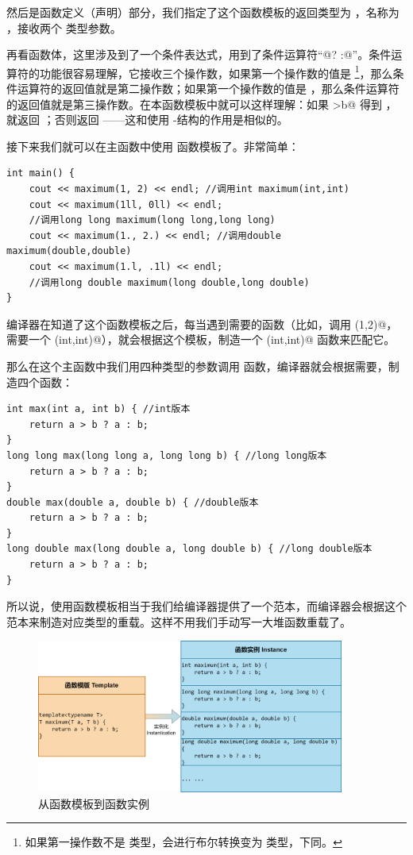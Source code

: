 然后是函数定义（声明）部分，我们指定了这个函数模板的返回类型为 \lstinline@T@，名称为 \lstinline@maximum@，接收两个 \lstinline@T@ 类型参数。\par
再看函数体，这里涉及到了一个条件表达式，用到了条件运算符``@? :@''。条件运算符的功能很容易理解，它接收三个操作数，如果第一个操作数的值是 \lstinline@true@\footnote{如果第一操作数不是 \lstinline@bool@ 类型，会进行布尔转换变为 \lstinline@bool@ 类型，下同。}，那么条件运算符的返回值就是第二操作数；如果第一个操作数的值是 \lstinline@false@，那么条件运算符的返回值就是第三操作数。在本函数模板中就可以这样理解：如果 \lstinline@a>b@ 得到 \lstinline@true@，就返回 \lstinline@a@；否则返回 \lstinline@b@——这和使用 \lstinline@if@-\lstinline@else@ 结构的作用是相似的。\par
接下来我们就可以在主函数中使用 \lstinline@maximum@ 函数模板了。非常简单：
\begin{lstlisting}
int main() {
    cout << maximum(1, 2) << endl; //调用int maximum(int,int)
    cout << maximum(1ll, 0ll) << endl;
    //调用long long maximum(long long,long long)
    cout << maximum(1., 2.) << endl; //调用double maximum(double,double)
    cout << maximum(1.l, .1l) << endl;
    //调用long double maximum(long double,long double)
}
\end{lstlisting}
编译器在知道了这个函数模板之后，每当遇到需要的函数（比如，调用 \lstinline@maximum(1,2)@，需要一个 \lstinline@maximum(int,int)@），就会根据这个模板，制造一个 \lstinline@maximum(int,int)@ 函数来匹配它。\par
那么在这个主函数中我们用四种类型的参数调用 \lstinline@maximum@ 函数，编译器就会根据需要，制造四个函数：
\begin{lstlisting}
int max(int a, int b) { //int版本
    return a > b ? a : b;
}
long long max(long long a, long long b) { //long long版本
    return a > b ? a : b;
}
double max(double a, double b) { //double版本
    return a > b ? a : b;
}
long double max(long double a, long double b) { //long double版本
    return a > b ? a : b;
}
\end{lstlisting}\par
所以说，使用函数模板相当于我们给编译器提供了一个范本，而编译器会根据这个范本来制造对应类型的重载。这样不用我们手动写一大堆函数重载了。\par
\begin{figure}[htbp]
    \centering
    \includegraphics[width=0.9\textwidth]{.//images/generalized_parts/04_function_template_and_instance.png}
    \caption{从函数模板到函数实例}
\end{figure}
